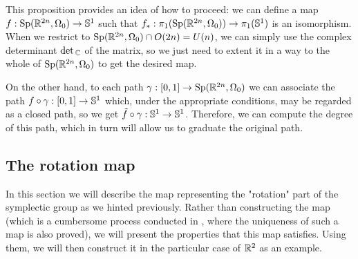 \begin{rmrk} \label{homotopygroupisomorphism}
This proposition provides an idea of how to proceed: we can define a map $f : \mathrm{Sp}(\mathbb{R}^{2n},\Omega_0) \rightarrow \mathbb{S}^1$ such that $f_{\ast} : \pi_1(\mathrm{Sp}(\mathbb{R}^{2n},\Omega_0)) \rightarrow \pi_1(\mathbb{S}^1)$ is an isomorphism. When we restrict to $\mathrm{Sp}(\mathbb{R}^{2n},\Omega_0) \cap O(2n) = U(n)$, we can simply use the complex determinant $\det{}_{\mathbb{C}}$ of the matrix, so we just need to extent it in a way to the whole of $\mathrm{Sp}(\mathbb{R}^{2n},\Omega_0)$ to get the desired map.

On the other hand, to each path $\gamma : [0,1] \rightarrow \mathrm{Sp}(\mathbb{R}^{2n},\Omega_0)$ we can associate the path $f \circ \gamma : [0,1] \rightarrow \mathbb{S}^1$ which, under the appropriate conditions, may be regarded as a closed path, so we get $\tilde{f} \circ \gamma : \mathbb{S}^1 \rightarrow \mathbb{S}^1$. Therefore, we can compute the degree of this path, which in turn will allow us to graduate the original path.
\end{rmrk}

\subsection{The rotation map}

In this section we will describe the map representing the "rotation" part of the symplectic group as we hinted previously. Rather than constructing the map (which is a cumbersome process conducted in \cite{gutt2012conley}, where the uniqueness of such a map is also proved), we will present the properties that this map satisfies. Using them, we will then construct it in the particular case of $\mathbb{R}^2$ as an example.

